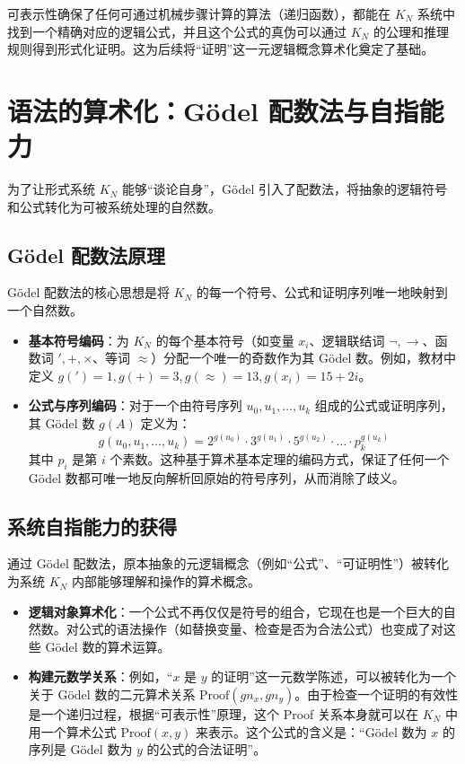 \documentclass[a4paper,12pt]{ctexart}
\begin{document}
可表示性确保了任何可通过机械步骤计算的算法（递归函数），都能在 $K_N$ 系统中找到一个精确对应的逻辑公式，并且这个公式的真伪可以通过 $K_N$ 的公理和推理规则得到形式化证明。这为后续将“证明”这一元逻辑概念算术化奠定了基础。

\section{语法的算术化：Gödel 配数法与自指能力}
为了让形式系统 $K_N$ 能够“谈论自身”，Gödel 引入了配数法，将抽象的逻辑符号和公式转化为可被系统处理的自然数。

\subsection{Gödel 配数法原理}
Gödel 配数法的核心思想是将 $K_N$ 的每一个符号、公式和证明序列唯一地映射到一个自然数。
\begin{itemize}[leftmargin=*,noitemsep,topsep=0pt]
    \item \textbf{基本符号编码}：为 $K_N$ 的每个基本符号（如变量 $x_i$、逻辑联结词 $\neg, \rightarrow$、函数词 $', +, \times$、等词 $\approx$）分配一个唯一的奇数作为其 Gödel 数。例如，教材中定义 $g(')=1, g(+)=3, g(\approx)=13, g(x_i)=15+2i$。
    \item \textbf{公式与序列编码}：对于一个由符号序列 $u_0, u_1, \dots, u_k$ 组成的公式或证明序列，其 Gödel 数 $g(A)$ 定义为：
    \[
        g(u_0, u_1, \dots, u_k) = 2^{g(u_0)} \cdot 3^{g(u_1)} \cdot 5^{g(u_2)} \cdot \dots \cdot p_k^{g(u_k)}
    \]
    其中 $p_i$ 是第 $i$ 个素数。这种基于算术基本定理的编码方式，保证了任何一个 Gödel 数都可唯一地反向解析回原始的符号序列，从而消除了歧义。
\end{itemize}

\subsection{系统自指能力的获得}
通过 Gödel 配数法，原本抽象的元逻辑概念（例如“公式”、“可证明性”）被转化为系统 $K_N$ 内部能够理解和操作的算术概念。
\begin{itemize}[leftmargin=*,noitemsep,topsep=0pt]
    \item \textbf{逻辑对象算术化}：一个公式不再仅仅是符号的组合，它现在也是一个巨大的自然数。对公式的语法操作（如替换变量、检查是否为合法公式）也变成了对这些 Gödel 数的算术运算。
    \item \textbf{构建元数学关系}：例如，“$x$ 是 $y$ 的证明”这一元数学陈述，可以被转化为一个关于 Gödel 数的二元算术关系 $\text{Proof}(gn_x, gn_y)$。由于检查一个证明的有效性是一个递归过程，根据“可表示性”原理，这个 Proof 关系本身就可以在 $K_N$ 中用一个算术公式 $\text{Proof}(x, y)$ 来表示。这个公式的含义是：“Gödel 数为 $x$ 的序列是 Gödel 数为 $y$ 的公式的合法证明”。
\end{itemize}
\end{document}
